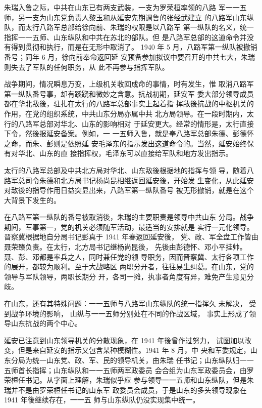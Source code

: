 朱瑞入鲁之际，中共在山东已有两支武装，一支为罗荣桓率领的八路
军一一五师，另一支为山东党负责人黎玉和从延安先期调鲁的张经武建立
的八路军山东纵队，而太行八路军总部给徐向前、朱瑞的权限是以八路军
第一纵队的名义，统一指挥一一五师、山东纵队和中共在苏北的部队。但
是八路军总部的这道命令并没有得到贯彻和执行，而是在无形中取消了。
1940 年 5 月，八路军第一纵队被撤销番号；同年 6 月，徐向前奉命返回延
安预备参加拟议中要召开的中共七大，朱瑞则失去了军队的任何职务，从
此不再参与指挥军队。

战争期间，情况瞬息万变，上级机关收回成命的事情，时有发生，惟
取消八路军第一纵队番号事，却有蹊跷和微妙之含意。抗战初期，延安军
委大部分领导成员都在华北敌後，驻扎在太行的八路军总部事实上起着指
挥敌後抗战的中枢机关的作用，在党的组织系统，中共山东分局亦属中共
北方局领导。在一段时期内，太行的八路军总部对华北、山东的影响相对
于延安更大。经常的情形是，太行直接下令，然後报延安备案。例如，一
一五师入鲁，就是奉八路军总部朱德、彭德怀之命，而朱、彭则是依照延
安毛泽东的指示发出这道命令的。当然，延安始终保有对华北、山东的直
接指挥权，毛泽东可以直接给军队和地方发出指示。

太行的八路军总部及中共北方局对华北、山东敌後根据地的指挥与领
导，随着八路军总司令朱德和北方局书记杨尚昆相继返回延安後，开始发
生变化，从此延安对敌後的指导作用日益突显出来，八路军第一纵队番号
被无形撤销，就是在这个大背景下发生的。

在八路军第一纵队的番号被取消後，朱瑞的主要职责是领导中共山东
分局。战争期间，军事第一，党的机关必须随军活动，最适当的安排就是
实行一元化领导。晋察冀根据地自分局书记彭真于 1941 年春返回延安後，
党、政、军全盘工作皆由聂荣臻负责。在太行，北方局书记继杨尚昆後，
先後由彭德怀、邓小平挂帅。聂、彭、邓都是率兵之人，同时兼任党的领
导职务，因而晋察冀、太行各项工作的展开，都较为顺利。至于大战略区
两职分开者，往往易生纠葛。在山东，党的领导与军队领导，两职长期分
开，各司一摊，执事者角度有异，难免产生意见分歧。

在山东，还有其特殊问题：一一五师与八路军山东纵队的统一指挥久
未解决，
受到战争环境的影响，
山纵与一一五师分别处在不同的作战区域，
事实上形成了领导山东抗战的两个中心。

延安已注意到山东领导机关的分散现象，在 1941 年後曾作过努力，
试图加以改变，但是来自延安的指示又包含某种模糊性。1941 年 8 月，中
央和军委规定，山东分局为统一山东党、政、军、民的领导机关，由朱瑞
任书记；山东纵队归一一五师首长指挥；山东纵队和一一五师两军政委员
会合组为山东军政委员会，由罗荣桓任书记。从字面上理解，朱瑞似乎应
参与领导一一五师和山东纵队，但是朱瑞并不是由罗荣桓任书记的山东军
政委员会成员，于是山东的多头领导现象在 1941 年後继续存在，一一五
师与山东纵队仍没实现集中统一。

